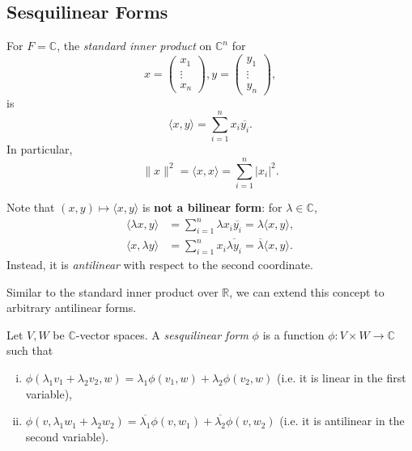 \documentclass[12pt]{article}
\begin{document}
\subsection{Sesquilinear Forms}
\label{sub:sesquilinear_forms}

\begin{definition}
	For $F = \mathbb{C}$, the \textit{standard inner product} on $\mathbb{C}^{n}$ for
\[
x =
\begin{pmatrix}
	x_1 \\
	\vdots \\
	x_n
\end{pmatrix}
, y =
\begin{pmatrix}
	y_1 \\
	\vdots \\
	y_n
\end{pmatrix}
,\]
is
\[
\langle x, y \rangle = \sum_{i = 1}^{n} x_i \overline{y_i}
.\]
In particular,
\[
\|x\|^2 = \langle x, x \rangle = \sum_{i = 1}^{n} |x_i|^2
.\]
\end{definition}

Note that $(x, y) \mapsto \langle x, y \rangle$ is \textbf{not a bilinear form}: for $\lambda \in \mathbb{C}$,
\begin{align*}
	\langle \lambda x, y \rangle &= \sum_{i = 1}^{n} \lambda x_i \overline{y_i} = \lambda \langle x, y \rangle, \\
	\langle x, \lambda y \rangle &= \sum_{i = 1}^{n} x_i \overline{\lambda y_i} = \overline{\lambda} \langle x, y \rangle.
\end{align*}
Instead, it is \textit{antilinear} with respect to the second coordinate.

Similar to the standard inner product over $\mathbb{R}$, we can extend this concept to arbitrary antilinear forms.

\begin{definition}
	Let $V, W$ be $\mathbb{C}$-vector spaces. A \textit{sesquilinear form} $\phi$ is a function $\phi : V \times W \to \mathbb{C}$ such that
	\begin{enumerate}[(i)]
		\item $\phi(\lambda_1v_1 + \lambda_2v_2, w) = \lambda_1 \phi(v_1, w) + \lambda_2 \phi(v_2, w)$ (i.e. it is linear in the first variable),
		\item $\phi(v, \lambda_1w_1 + \lambda_2w_2) = \overline{\lambda_1}\phi(v, w_1) + \overline{\lambda_2}\phi(v, w_2)$ (i.e. it is antilinear in the second variable).
	\end{enumerate}
\end{definition}
\end{document}
